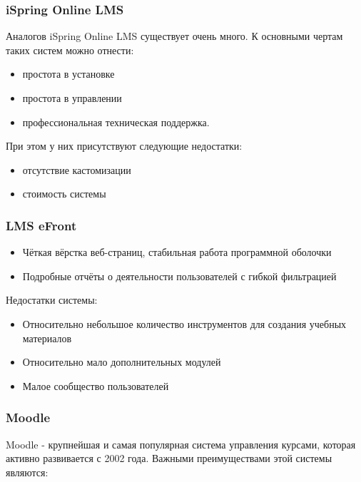 \documentclass[a4paper,14pt]{article}
\begin{document}
\subsubsection{iSpring Online LMS}

Аналогов iSpring Online LMS существует очень много.
К основными чертам таких систем можно отнести:
\begin{itemize}
	\item простота в установке
	\item простота в управлении	
	\item профессиональная техническая поддержка.
\end{itemize}

При этом у них присутствуют следующие недостатки:
\begin{itemize}
	\item отсутствие кастомизации
	\item стоимость системы
\end{itemize} 

\subsubsection{LMS eFront }

\begin{itemize}
	\item Чёткая вёрстка веб-страниц, стабильная работа программной оболочки 
	\item Подробные отчёты о деятельности пользователей с гибкой фильтрацией	
	
\end{itemize} 

Недостатки системы:

\begin{itemize}
	\item Относительно небольшое количество инструментов для создания учебных материалов
	\item Относительно мало дополнительных модулей
	\item Малое сообщество пользователей
	
	
\end{itemize} 

\subsubsection{Moodle}

Moodle - крупнейшая и самая популярная система управления курсами, которая активно развивается с 2002 года. Важными преимуществами этой системы являются:
\end{document}
